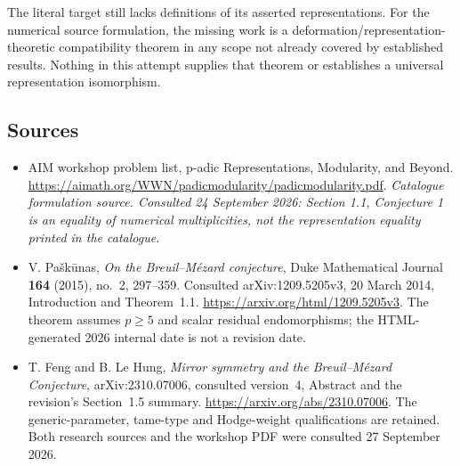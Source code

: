 \documentclass[11pt,a4paper]{article}
\numberwithin{equation}{section}
\begin{document}
The literal target still lacks definitions of its asserted
representations. For the numerical source formulation, the missing work
is a deformation/representation-theoretic compatibility theorem in any
scope not already covered by established results. Nothing in this
attempt supplies that theorem or establishes a universal representation
isomorphism.
\subsection{Sources}
\begin{itemize}\raggedright
\item[\textnormal{[S1]}]\hypertarget{source:228:1}{} AIM workshop problem list, p-adic Representations, Modularity, and Beyond.
\url{https://aimath.org/WWN/padicmodularity/padicmodularity.pdf}.
{\small\textit{Catalogue formulation source. Consulted 24 September 2026: Section 1.1, Conjecture 1 is an equality of numerical multiplicities, not the representation equality printed in the catalogue.}}
\item[\textnormal{[E1]}]\hypertarget{extra:228:1}{}
V. Pa\v{s}k\=unas, \emph{On the Breuil--M\'ezard conjecture},
Duke Mathematical Journal \textbf{164} (2015), no.~2, 297--359.
Consulted arXiv:1209.5205v3, 20 March 2014, Introduction and
Theorem~1.1. \url{https://arxiv.org/html/1209.5205v3}.
The theorem assumes $p\ge5$ and scalar residual endomorphisms; the
HTML-generated 2026 internal date is not a revision date.
\item[\textnormal{[E2]}]\hypertarget{extra:228:2}{}
T. Feng and B. Le Hung, \emph{Mirror symmetry and the Breuil--M\'ezard
Conjecture}, arXiv:2310.07006, consulted version~4, Abstract and the
revision's Section~1.5 summary. \url{https://arxiv.org/abs/2310.07006}.
The generic-parameter, tame-type and Hodge-weight qualifications are
retained. Both research sources and the workshop PDF were consulted
27 September 2026.
\end{itemize}
\end{document}
